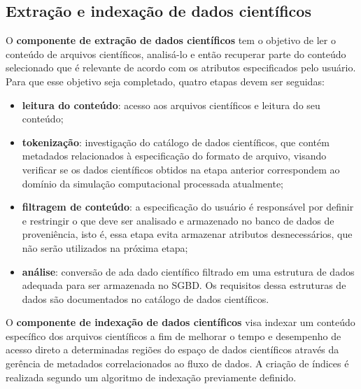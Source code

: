 \subsection{Extração e indexação de dados científicos}

O \textbf{componente de extração de dados científicos} tem o objetivo de ler o conteúdo de arquivos científicos, analisá-lo e então recuperar parte do conteúdo selecionado que é relevante de acordo com os atributos especificados pelo usuário. Para que esse objetivo seja completado, quatro etapas devem ser seguidas:

\begin{itemize}
    \item \textbf{leitura do conteúdo}: acesso aos arquivos científicos e leitura do seu conteúdo;
    \item \textbf{tokenização}: investigação do catálogo de dados científicos, que contém metadados relacionados à especificação do formato de arquivo, visando verificar se os dados científicos obtidos na etapa anterior correspondem ao domínio da simulação computacional processada atualmente;
    \item \textbf{filtragem de conteúdo}: a especificação do usuário é responsável por definir e restringir o que deve ser analisado e armazenado no banco de dados de proveniência, isto é, essa etapa evita armazenar atributos desnecessários, que não serão utilizados na próxima etapa;
    \item \textbf{análise}: conversão de ada dado científico filtrado em uma estrutura de dados adequada para ser armazenada no SGBD. Os requisitos dessa estruturas de dados são documentados no catálogo de dados científicos.
\end{itemize}

O \textbf{componente de indexação de dados científicos} visa indexar um conteúdo específico dos arquivos científicos a fim de melhorar o tempo e desempenho de acesso direto a determinadas regiões do espaço de dados científicos através da gerência de metadados correlacionados ao fluxo de dados. A criação de índices é realizada segundo um algoritmo de indexação previamente definido.



